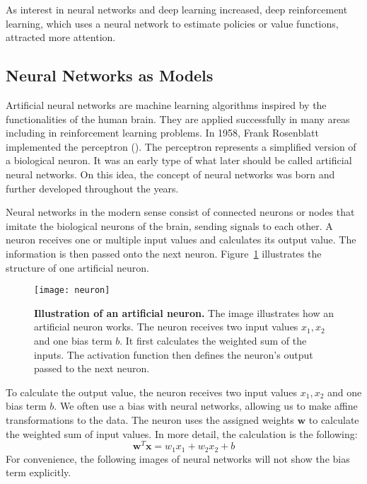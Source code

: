 As interest in neural networks and deep learning increased, deep reinforcement learning, which uses a neural network to estimate policies or value functions, attracted more attention.


\subsection{Neural Networks as Models}
\label{subsec:NN}
Artificial neural networks are machine learning algorithms inspired by the functionalities of the human brain. They are applied successfully in many areas including in reinforcement learning problems. In 1958, Frank Rosenblatt implemented the perceptron (\cite{rosenblatt1958perceptron}). The perceptron represents a simplified version of a biological neuron. It was an early type of what later should be called artificial neural networks. On this idea, the concept of neural networks was born and further developed throughout the years.

Neural networks in the modern sense consist of connected neurons or nodes that imitate the biological neurons of the brain, sending signals to each other. A neuron receives one or multiple input values and calculates its output value. The information is then passed onto the next neuron. Figure~\ref{fig:neuron} illustrates the structure of one artificial neuron.
\begin{figure}[ht]
\centering
\texttt{[image: neuron]}
\caption[Illustration of an artificial neuron]{
  \textbf{Illustration of an artificial neuron.}
  The image illustrates how an artificial neuron works. The neuron receives two input values $x_1, x_2$ and one bias term $b$. It first calculates the weighted sum of the inputs. The activation function then defines the neuron's output passed to the next neuron.
}
\label{fig:neuron}
\end{figure}
To calculate the output value, the neuron receives two input values $x_1, x_2$ and one bias term $b$. We often use a bias with neural networks, allowing us to make affine transformations to the data. The neuron uses the assigned weights $\mathbf{w}$ to calculate the weighted sum of input values. In  more detail, the calculation is the following:
\[
  \mathbf{w}^T \mathbf{x} = w_1 x_1 + w_2 x_2 + b
\]
For convenience, the following images of neural networks will not show the bias term explicitly.

